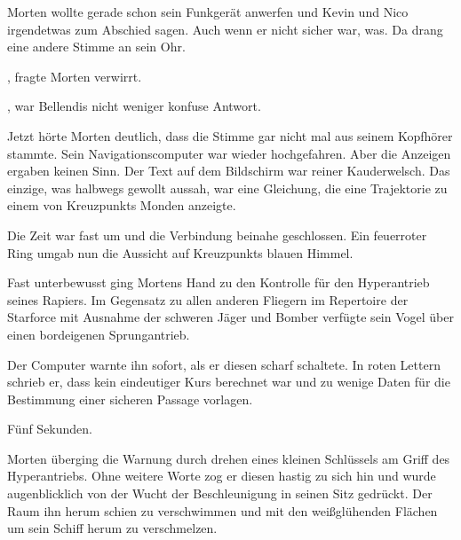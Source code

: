 \par

Morten wollte gerade schon sein Funkgerät anwerfen und Kevin und Nico irgendetwas zum Abschied sagen. Auch wenn er nicht sicher war, was. Da drang eine andere Stimme an sein Ohr.

\par


\par

, fragte Morten verwirrt. 

\par

, war Bellendis nicht weniger konfuse Antwort.

\par


\par

Jetzt hörte Morten deutlich, dass die Stimme gar nicht mal aus seinem Kopfhörer stammte. Sein Navigationscomputer war wieder hochgefahren. Aber die Anzeigen ergaben keinen Sinn. Der Text auf dem Bildschirm war reiner Kauderwelsch. Das einzige, was halbwegs gewollt aussah, war eine Gleichung, die eine Trajektorie zu einem von Kreuzpunkts Monden anzeigte.

\par


\par

Die Zeit war fast um und die Verbindung beinahe geschlossen. Ein feuerroter Ring umgab nun die Aussicht auf Kreuzpunkts blauen Himmel.

\par

Fast unterbewusst ging Mortens Hand zu den Kontrolle für den Hyperantrieb seines Rapiers. Im Gegensatz zu allen anderen Fliegern im Repertoire der Starforce mit Ausnahme der schweren Jäger und Bomber verfügte sein Vogel über einen bordeigenen Sprungantrieb.

\par

Der Computer warnte ihn sofort, als er diesen scharf schaltete. In roten Lettern schrieb er, dass kein eindeutiger Kurs berechnet war und zu wenige Daten für die Bestimmung einer sicheren Passage vorlagen.

\par

Fünf Sekunden.

\par

Morten überging die Warnung durch drehen eines kleinen Schlüssels am Griff des Hyperantriebs. Ohne weitere Worte zog er diesen hastig zu sich hin und wurde augenblicklich von der Wucht der Beschleunigung in seinen Sitz gedrückt. Der Raum ihn herum schien zu verschwimmen und mit den weißglühenden Flächen um sein Schiff herum zu verschmelzen.

